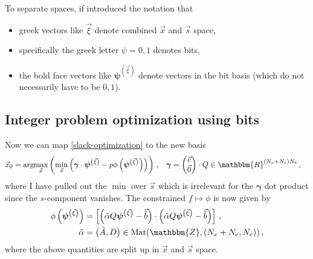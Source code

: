 \documentclass[]{article}
\newcommand{\argmax}[1]{\text{arg}\hspace{-2pt}\max\limits_{#1}}
\newcommand{\bvec}[1]{\boldsymbol{#1}}
\begin{document}
To separate spaces, if introduced the notation that
\begin{itemize}
	\item greek vectors like $\vec \xi$ denote combined $\vec x$ and $\vec s$ space,
	\item specifically the greek letter $\psi = 0, 1$ denotes bits,
	\item the bold face vectors like $\bvec \psi^{\left( \vec \xi \right)}$ denote vectors in the bit basis (which do not necessarily have to be $0,1$).
\end{itemize}


\subsection{Integer problem optimization using bits}
Now we can map \eqref{slack-optimization} to the new basis
\begin{align}
	\vec x_0 
	&= \argmax{\vec x}\left(\min\limits_{\vec s}
	\left( \bvec \gamma \cdot \bvec \psi^{\left( \vec \xi \right)} - p \phi\left(\bvec \psi^{\left( \vec \xi \right)}\right)\right)\right) \, , &
	\bvec \gamma &= \begin{pmatrix}
		\vec c \\ \vec 0
	\end{pmatrix} \cdot Q \in \mathbbm{R}^{(N_x + N_e )N_b} \, , 
\end{align}
where I have pulled out the $\min$ over $\vec s$ which is irrelevant for the $\bvec \gamma$ dot product since the $s$-component vanishes.
The constrained $f \mapsto \phi$ is now given by
\begin{align}\label{bit-penalty}
	\phi\left(\bvec \psi^{\left( \vec \xi \right)}\right)
	&=
	\left[
	\left(
		\tilde{\alpha} Q \bvec \psi^{\left( \vec \xi \right)} - \vec{\tilde{b}}\right) 
		\cdot \left({\tilde{\alpha}} Q \bvec \psi^{\left( \vec \xi \right)} - \vec{\tilde{b}}\right)\right]
	\, , \\
	{\tilde{\alpha}} &= \left(\tilde{A},  D \right) \in \text{Mat}(\mathbbm{Z}, (N_x + N_e, N_e))\, ,
\end{align}
where the above quantities are split up in $\vec x$ and $\vec s$ space.
\end{document}
